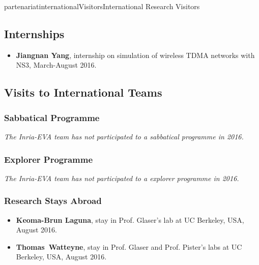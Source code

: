 \documentclass{ra2016}
\newcommand{\thomas}           {\textbf{Thomas~Watteyne}}
\begin{document}
\begin{module}{partenariat}{internationalVisitors}{International Research Visitors}
\subsection{Internships}

\begin{itemize}
    \item{\bf Jiangnan Yang}, internship on simulation of wireless TDMA networks with NS3, March-August 2016.
\end{itemize}

\subsection{Visits to International Teams}


\subsubsection{Sabbatical Programme}

\textit{The Inria-EVA team has not participated to a sabbatical programme in 2016.}

\subsubsection{Explorer Programme}

\textit{The Inria-EVA team has not participated to a explorer programme in 2016.}

\subsubsection{Research Stays Abroad}


\begin{itemize}
    \item{\bf Keoma-Brun Laguna}, stay in Prof. Glaser's lab at UC Berkeley, USA, August 2016.
    \item{\bf \thomas}, stay in Prof. Glaser and Prof. Pister's labs at UC Berkeley, USA, August 2016.
\end{itemize}

\end{module}
\end{document}
